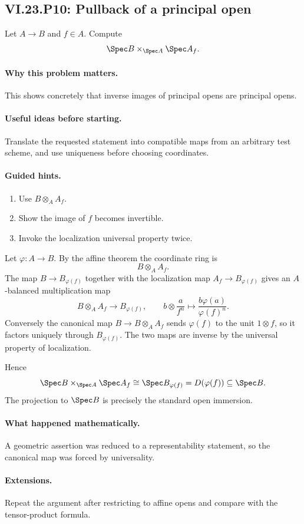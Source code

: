 \subsection*{VI.23.P10: Pullback of a principal open}
\begin{problem}\label{prob:vi23-p10}
Let $A\to B$ and $f\in A$. Compute
\[
\Spec B\times_{\Spec A}\Spec A_f.
\]
\end{problem}

\ifdefined\FullProblemDossiers
\paragraph{Why this problem matters.}
This shows concretely that inverse images of principal opens are principal opens.

\paragraph{Useful ideas before starting.}
Translate the requested statement into compatible maps from an arbitrary test scheme, and use uniqueness before choosing coordinates.

\paragraph{Guided hints.}
\begin{enumerate}
\item Use $B\otimes_AA_f$.
\item Show the image of $f$ becomes invertible.
\item Invoke the localization universal property twice.
\end{enumerate}

\begin{solution}
Let $\varphi:A\to B$.  By the affine theorem the coordinate ring is
\[
B\otimes_AA_f.
\]
The map $B\to B_{\varphi(f)}$ together with the localization map
$A_f\to B_{\varphi(f)}$ gives an $A$-balanced multiplication map
\[
B\otimes_AA_f\to B_{\varphi(f)},\qquad
b\otimes\frac{a}{f^n}\mapsto\frac{b\varphi(a)}{\varphi(f)^n}.
\]
Conversely the canonical map $B\to B\otimes_AA_f$ sends $\varphi(f)$ to the unit
$1\otimes f$, so it factors uniquely through $B_{\varphi(f)}$.  The two maps are inverse by the
universal property of localization.

Hence
\[
\Spec B\times_{\Spec A}\Spec A_f
\cong\Spec B_{\varphi(f)}
=D(\varphi(f))\subseteq\Spec B.
\]
The projection to $\Spec B$ is precisely the standard open immersion.
\end{solution}

\paragraph{What happened mathematically.}
A geometric assertion was reduced to a representability statement, so the canonical map was forced by universality.

\paragraph{Extensions.}
Repeat the argument after restricting to affine opens and compare with the tensor-product formula.
\fi
